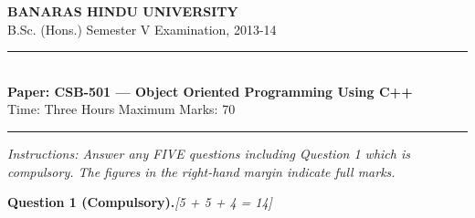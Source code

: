 \documentclass[11pt,a4paper]{article}
\newcommand{\pts}[1]{\hfill   \textit{[#1]}}
\begin{document}
\begin{center}
  {\large\bfseries BANARAS HINDU UNIVERSITY}\\[2pt]
  {
\normalsize B.Sc. (Hons.) Semester V Examination, 2013-14}\\[6pt]
  \rule{0.8\linewidth}{0.5pt}\\[6pt]
  {\large\bfseries Paper: CSB-501 --- Object Oriented Programming Using C++}\\[4pt]
  {
\normalsize Time: Three Hours \hfill Maximum Marks: 70}
\end{center}

\rule{\linewidth}{0.4pt}

\smallskip



\noindent   \textit{Instructions: Answer any FIVE questions including Question 1 which is compulsory. The figures in the right-hand margin indicate full marks.}

\bigskip

\medskip


\noindent   \textbf{Question 1 (Compulsory).}\pts{5 + 5 + 4 = 14}
\end{document}
